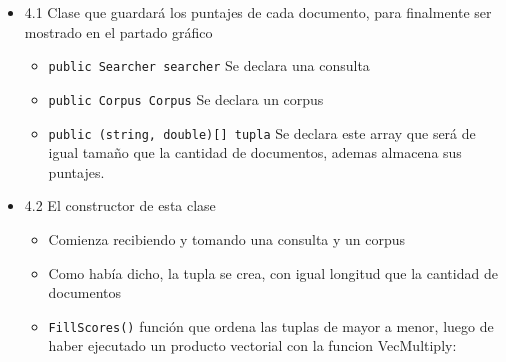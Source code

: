 \begin{enumerate}
  \begin{itemize}
  \tightlist
  \item
    4.1 Clase que guardará los puntajes de cada documento, para
    finalmente ser mostrado en el partado gráfico

    \begin{itemize}
    \tightlist
    \item
      \texttt{public\ Searcher\ searcher} Se declara una consulta
    \item
      \texttt{public\ Corpus\ Corpus} Se declara un corpus
    \item
      \texttt{public\ (string,\ double){[}{]}\ tupla} Se declara este
      array que será de igual tamaño que la cantidad de documentos,
      ademas almacena sus puntajes.
    \end{itemize}
  \item
    4.2 El constructor de esta clase

    \begin{itemize}
    \tightlist
    \item
      Comienza recibiendo y tomando una consulta y un corpus
    \item
      Como había dicho, la tupla se crea, con igual longitud que la
      cantidad de documentos
    \item
      \texttt{FillScores()} función que ordena las tuplas de mayor a
      menor, luego de haber ejecutado un producto vectorial con la
      funcion VecMultiply:
    \end{itemize}


\end{itemize}
\end{enumerate}
